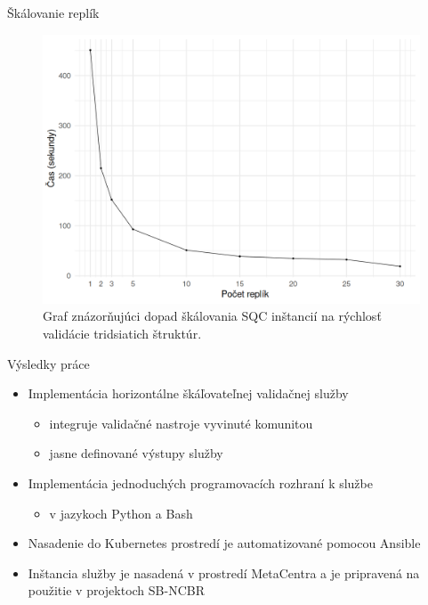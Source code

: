 \documentclass[
  aspectratio=169,
]{beamer}
\begin{document}
\begin{frame}{Škálovanie replík}
\begin{figure}
  \includegraphics[width=.8\textwidth,height=.8\textheight,keepaspectratio]{img/replica-perf.png}
  \caption{Graf znázorňujúci dopad škálovania SQC inštancií na rýchlosť validácie tridsiatich štruktúr.}
\end{figure}
\end{frame}

\begin{frame}{Výsledky práce}
\begin{itemize}
  \item Implementácia horizontálne škáľovateľnej validačnej služby
  \begin{itemize}
    \item integruje validačné nastroje vyvinuté komunitou
    \item jasne definované výstupy služby
  \end{itemize}

  \item Implementácia jednoduchých programovacích rozhraní k službe
  \begin{itemize}
    \item v jazykoch Python a Bash
  \end{itemize}

  \item Nasadenie do Kubernetes prostredí je automatizované pomocou Ansible
  \item Inštancia služby je nasadená v prostredí MetaCentra a je pripravená na použitie v projektoch SB-NCBR
\end{itemize}
\end{frame}
\end{document}
